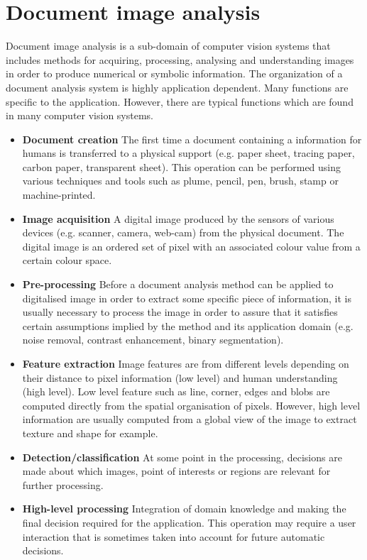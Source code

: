 \section{Document image analysis} %
\label{sec:document_image_analysis}
Document image analysis is a sub-domain of computer vision systems that includes methods for acquiring, processing, analysing and understanding images in order to produce numerical or symbolic information.
The organization of a document analysis system is highly application dependent. Many functions are specific to the application.
However, there are typical functions which are found in many computer vision systems.

\begin{itemize}
	\item \textbf{Document creation} The first time a document containing a information for humans is transferred to a physical support (e.g. paper sheet, tracing paper, carbon paper, transparent sheet).
	This operation can be performed using various techniques and tools such as plume, pencil, pen, brush, stamp or machine-printed.
	\item \textbf{Image acquisition} A digital image produced by the sensors of various devices (e.g. scanner, camera, web-cam) from the physical document.
	The digital image is an ordered set of pixel with an associated colour value from a certain colour space.
	\item \textbf{Pre-processing} Before a document analysis method can be applied to digitalised image in order to extract some specific piece of information, it is usually necessary to process the image in order to assure that it satisfies certain assumptions implied by the method and its application domain (e.g. noise removal, contrast enhancement, binary segmentation).
	\item \textbf{Feature extraction} Image features are from different levels depending on their distance to pixel information (low level) and human understanding (high level).
	Low level feature such as line, corner, edges and blobs are computed directly from the spatial organisation of pixels.
	However, high level information are usually computed from a global view of the image to extract texture and shape for example.
	\item \textbf{Detection/classification} At some point in the processing, decisions are made about which images, point of interests or regions are relevant for further processing.
	\item \textbf{High-level processing} Integration of domain knowledge and making the final decision required for the application.
	This operation may require a user interaction that is sometimes taken into account for future automatic decisions.
\end{itemize}

